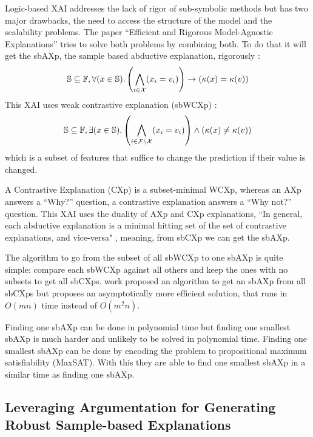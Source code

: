 Logic-based XAI addresses the lack of rigor of sub-symbolic methods but has two major drawbacks, 
the need to access the structure of the model and the scalability problems. The paper “Efficient and Rigorous 
Model-Agnostic Explanations” \cite{marques-silva_efficient_2025} tries to solve both problems by combining both. 
To do that it will get the sbAXp, the sample based abductive explanation, rigorously : 
    \begin{equation}
        \mathbb{S} \subseteq \mathbb{F},\space\forall(x \in \mathbb{S}) . \left( \bigwedge_{i \in \mathcal{X}} (x_i = v_i) \right) \rightarrow (\kappa(x) = \kappa(v))
    \end{equation}
This XAI uses weak contrastive explanation (sbWCXp) : 
    \begin{equation}
        \mathbb{S} \subseteq \mathbb{F},\space \exists(x \in \mathbb{S}) . \left( \bigwedge_{i \in \mathcal{F} \setminus \mathcal{X}} (x_i = v_i) \right) \wedge (\kappa(x) \neq \kappa(v))
    \end{equation}
which is a subset of features that suffice to change the prediction if their value is changed.

A Contrastive Explanation (CXp) is a subset-minimal WCXp, whereas an AXp answers a “Why?” question, 
a contrastive explanation answers a “Why not?” question. This XAI uses the duality of AXp and CXp explanations, 
“In general, each abductive explanation is a minimal hitting set of the set of contrastive explanations, 
and vice-versa" \cite{marques-silva_efficient_2025}, meaning, from sbCXp we can get the sbAXp.

The algorithm to go from the subset of all sbWCXp to one sbAXp is quite simple: compare each sbWCXp 
against all others and keep the ones with no subsets to get all sbCXps. 
\textcite{cooper_abductive_2024} work proposed an algorithm to get an sbAXp from all sbCXps but 
\textcite{marques-silva_efficient_2025} proposes an asymptotically more efficient solution, that runs 
in $O(mn)$ time instead of $O(m^2n)$. 

Finding one sbAXp can be done in polynomial time but finding one smallest sbAXp is much harder and 
unlikely to be solved in polynomial time. Finding one smallest sbAXp can be done by encoding the 
problem to propositional maximum satisfiability (MaxSAT). With this they are able to find one smallest sbAXp 
in a similar time as finding one sbAXp.

\subsection{Leveraging Argumentation for Generating Robust Sample-based Explanations}

